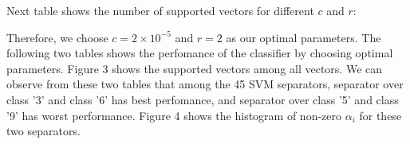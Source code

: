 \documentclass{article}
\begin{document}
Next table shows the number of supported vectors for different $c$ and $r$:


Therefore, we choose $c=2\times10^{-5}$ and $r=2$ as our optimal parameters. The following two tables shows the perfomance of the classifier by choosing optimal parameters. 
Figure 3 shows the supported vectors among all vectors. We can observe from these two tables that among the 45 SVM separators, separator over class '3' and class '6' has best perfomance, and separator over class '5' and class '9' has worst performance. Figure 4 shows the histogram of non-zero $\alpha_{i}$ for these two separators. 
\end{document}
